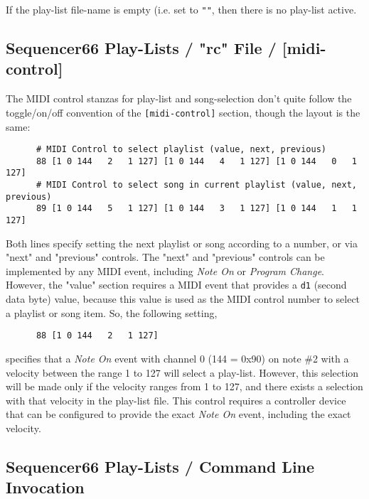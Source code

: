    If the play-list file-name is empty (i.e. set to \texttt{""}, then there is
   no play-list active.

\subsection{Sequencer66 Play-Lists / "rc" File / [midi-control]}
\label{subsec:playlist_rc_file_midi_ctrl}

   The MIDI control stanzas for play-list and song-selection don't quite follow
   the toggle/on/off convention of the \texttt{[midi-control]} section, though
   the layout is the same:

   \begin{verbatim}
      # MIDI Control to select playlist (value, next, previous)
      88 [1 0 144   2   1 127] [1 0 144   4   1 127] [1 0 144   0   1 127]
      # MIDI Control to select song in current playlist (value, next, previous)
      89 [1 0 144   5   1 127] [1 0 144   3   1 127] [1 0 144   1   1 127]
   \end{verbatim}

   Both lines specify setting the next playlist or song according to a number,
   or via "next" and "previous" controls.  The "next" and "previous" controls
   can be implemented by any MIDI event, including \textsl{Note On} or
   \textsl{Program Change}.  However, the "value" section requires a MIDI event
   that provides a \texttt{d1} (second data byte) value, because this value is
   used as the MIDI control number to select a playlist or song item.
   So, the following setting,

   \begin{verbatim}
      88 [1 0 144   2   1 127]
   \end{verbatim}

   specifies that a \textsl{Note On} event with channel 0 (144 = 0x90) on note
   \#2 with a velocity between the range 1 to 127 will select a play-list.
   However, this selection will be made only if the velocity ranges from 1 to
   127, and there exists a selection with that velocity in the play-list file.
   This control requires a controller device that can be configured to provide
   the exact \textsl{Note On} event, including the exact velocity.

\subsection{Sequencer66 Play-Lists / Command Line Invocation}
\label{subsec:playlist_cmd_line}


